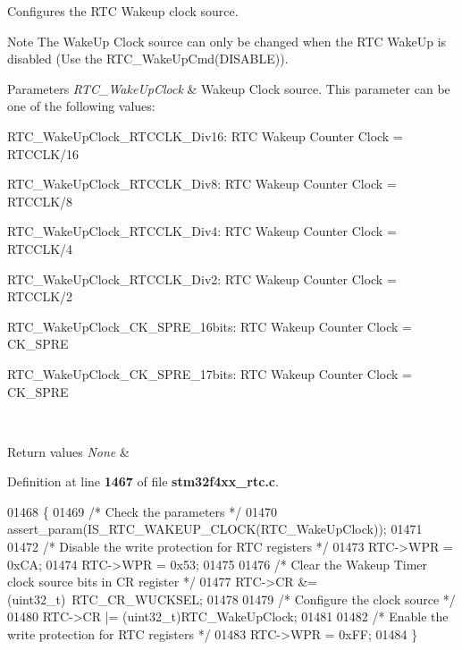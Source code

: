 Configures the R\+TC Wakeup clock source. 

\begin{DoxyNote}{Note}
The Wake\+Up Clock source can only be changed when the R\+TC Wake\+Up is disabled (Use the R\+T\+C\+\_\+\+Wake\+Up\+Cmd(\+D\+I\+S\+A\+B\+L\+E)). 
\end{DoxyNote}

\begin{DoxyParams}{Parameters}
{\em R\+T\+C\+\_\+\+Wake\+Up\+Clock} & Wakeup Clock source. This parameter can be one of the following values\+: \begin{DoxyItemize}
\item R\+T\+C\+\_\+\+Wake\+Up\+Clock\+\_\+\+R\+T\+C\+C\+L\+K\+\_\+\+Div16\+: R\+TC Wakeup Counter Clock = R\+T\+C\+C\+L\+K/16 \item R\+T\+C\+\_\+\+Wake\+Up\+Clock\+\_\+\+R\+T\+C\+C\+L\+K\+\_\+\+Div8\+: R\+TC Wakeup Counter Clock = R\+T\+C\+C\+L\+K/8 \item R\+T\+C\+\_\+\+Wake\+Up\+Clock\+\_\+\+R\+T\+C\+C\+L\+K\+\_\+\+Div4\+: R\+TC Wakeup Counter Clock = R\+T\+C\+C\+L\+K/4 \item R\+T\+C\+\_\+\+Wake\+Up\+Clock\+\_\+\+R\+T\+C\+C\+L\+K\+\_\+\+Div2\+: R\+TC Wakeup Counter Clock = R\+T\+C\+C\+L\+K/2 \item R\+T\+C\+\_\+\+Wake\+Up\+Clock\+\_\+\+C\+K\+\_\+\+S\+P\+R\+E\+\_\+16bits\+: R\+TC Wakeup Counter Clock = C\+K\+\_\+\+S\+P\+RE \item R\+T\+C\+\_\+\+Wake\+Up\+Clock\+\_\+\+C\+K\+\_\+\+S\+P\+R\+E\+\_\+17bits\+: R\+TC Wakeup Counter Clock = C\+K\+\_\+\+S\+P\+RE \end{DoxyItemize}
\\
\hline
\end{DoxyParams}

\begin{DoxyRetVals}{Return values}
{\em None} & \\
\hline
\end{DoxyRetVals}


Definition at line \textbf{ 1467} of file \textbf{ stm32f4xx\+\_\+rtc.\+c}.


\begin{DoxyCode}
01468 \{
01469   \textcolor{comment}{/* Check the parameters */}
01470   assert_param(IS_RTC_WAKEUP_CLOCK(RTC\_WakeUpClock));
01471 
01472   \textcolor{comment}{/* Disable the write protection for RTC registers */}
01473   RTC->WPR = 0xCA;
01474   RTC->WPR = 0x53;
01475 
01476   \textcolor{comment}{/* Clear the Wakeup Timer clock source bits in CR register */}
01477   RTC->CR &= (uint32\_t)~RTC_CR_WUCKSEL;
01478 
01479   \textcolor{comment}{/* Configure the clock source */}
01480   RTC->CR |= (uint32\_t)RTC\_WakeUpClock;
01481   
01482   \textcolor{comment}{/* Enable the write protection for RTC registers */}
01483   RTC->WPR = 0xFF; 
01484 \}
\end{DoxyCode}
\mbox{\label{group__RTC__Group4_ga2ce05293303e0d7879c6d755c5355b4c}} 
